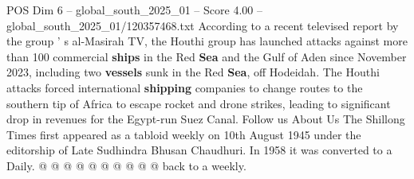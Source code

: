 \begin{textsample}{POS Dim 6 – global\_south\_2025\_01 – Score 4.00 – global\_south\_2025\_01/120357468.txt}
According to a recent televised report by the group ' s al-Masirah TV, the Houthi group has launched attacks against more than 100 commercial \textbf{ships} in the Red \textbf{Sea} and the Gulf of Aden since November 2023, including two \textbf{vessels} sunk in the Red \textbf{Sea}, off Hodeidah.
The Houthi attacks forced international \textbf{shipping} companies to change routes to the southern tip of Africa to escape rocket and drone strikes, leading to significant drop in revenues for the Egypt-run Suez Canal.
Follow us About Us The Shillong Times first appeared as a tabloid weekly on 10th August 1945 under the editorship of Late Sudhindra Bhusan Chaudhuri.
In 1958 it was converted to a Daily. @ @ @ @ @ @ @ @ @ @ back to a weekly.

\end{textsample}
